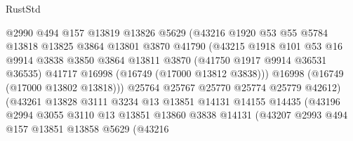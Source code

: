 \begin{lexlean}{RustStd}
\begin{coremodule}
                              @2990
                              @494
                              @157
                              @13819
                              @13826
                              @5629
                              (@43216
                                @1920
                                @53
                                @55
                                @5784
                                @13818
                                @13825
                                @3864
                                @13801
                                @3870
                                @41790
                                (@43215
                                  @1918
                                  @101
                                  @53
                                  @16
                                  @9914
                                  @3838
                                  @3850
                                  @3864
                                  @13811
                                  @3870
                                  (@41750 @1917 @9914 @36531 @36535)
                                  @41717
                                  @16998
                                  (@16749 (@17000 @13812 @3838)))
                                @16998
                                (@16749 (@17000 @13802 @13818)))
                              @25764
                              @25767
                              @25770
                              @25774
                              @25779
                              @42612)
                            (@43261
                              @13828
                              @3111
                              @3234
                              @13
                              @13851
                              @14131
                              @14155
                              @14435
                              (@43196
                                @2994
                                @3055
                                @3110
                                @13
                                @13851
                                @13860
                                @3838
                                @14131
                                (@43207
                                  @2993
                                  @494
                                  @157
                                  @13851
                                  @13858
                                  @5629
                                  (@43216

\end{coremodule}
\end{lexlean}
